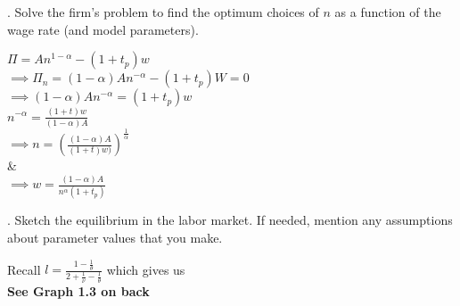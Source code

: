 \documentclass[11pt]{SelfArxOneColBMN}
\begin{document}
. Solve the firm's problem to find the optimum choices of $n$ as a function of the wage rate (and model parameters).
	\begin{solution}
		$\Pi = An^{1 - \alpha} - (1 + t_p)w$\\
		$\implies \Pi_n = (1 - \alpha)An^{-\alpha} - (1 + t_p)W = 0$\\
		$\implies (1 - \alpha)An^{-\alpha} = (1 + t_p)w$\\
		$n ^{- \alpha} = \frac{(1 + t)w}{(1 - \alpha)A}$\\
		$\implies n = (\frac{(1 - \alpha)A}{(1 + t)w)})^{\frac{1}{\alpha}}$\\
		\&\\
		$\implies w = \frac{(1 - \alpha)A}{n^\alpha (1 + t_p)}$\\
	\end{solution}

. Sketch the equilibrium in the labor market. If needed, mention any assumptions about parameter values that you make.\\
	\begin{solution}
		Recall $l =\frac{1 - \frac{1}{\theta}}{2 + \frac{1}{\nu} - \frac{1}{\theta}}$ which gives us\\
		\textbf{See Graph 1.3 on back}
	\end{solution}
\end{document}
